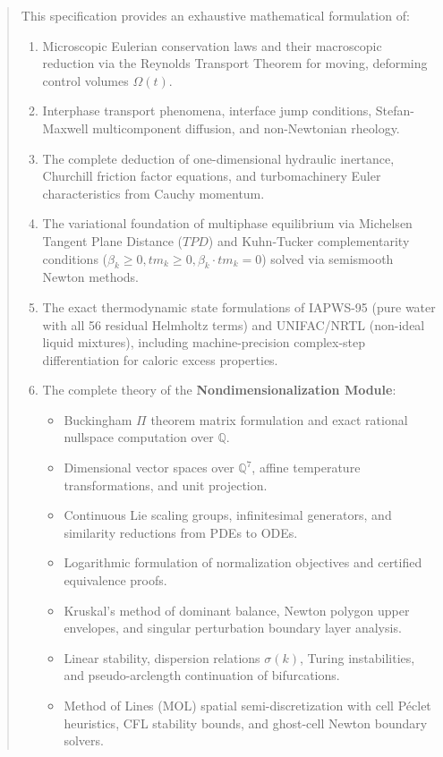 \documentclass[11pt,a4paper]{article}
\begin{document}
\begin{abstract}
This specification provides an exhaustive mathematical formulation of:
\begin{enumerate}[leftmargin=*]
    \item Microscopic Eulerian conservation laws and their macroscopic reduction via the Reynolds Transport Theorem for moving, deforming control volumes $\Omega(t)$.
    \item Interphase transport phenomena, interface jump conditions, Stefan-Maxwell multicomponent diffusion, and non-Newtonian rheology.
    \item The complete deduction of one-dimensional hydraulic inertance, Churchill friction factor equations, and turbomachinery Euler characteristics from Cauchy momentum.
    \item The variational foundation of multiphase equilibrium via Michelsen Tangent Plane Distance ($TPD$) and Kuhn-Tucker complementarity conditions ($\beta_k \ge 0, tm_k \ge 0, \beta_k \cdot tm_k = 0$) solved via semismooth Newton methods.
    \item The exact thermodynamic state formulations of IAPWS-95 (pure water with all 56 residual Helmholtz terms) and UNIFAC/NRTL (non-ideal liquid mixtures), including machine-precision complex-step differentiation for caloric excess properties.
    \item The complete theory of the \textbf{Nondimensionalization Module}:
    \begin{itemize}
        \item Buckingham $\Pi$ theorem matrix formulation and exact rational nullspace computation over $\mathbb{Q}$.
        \item Dimensional vector spaces over $\mathbb{Q}^7$, affine temperature transformations, and unit projection.
        \item Continuous Lie scaling groups, infinitesimal generators, and similarity reductions from PDEs to ODEs.
        \item Logarithmic formulation of normalization objectives and certified equivalence proofs.
        \item Kruskal's method of dominant balance, Newton polygon upper envelopes, and singular perturbation boundary layer analysis.
        \item Linear stability, dispersion relations $\sigma(k)$, Turing instabilities, and pseudo-arclength continuation of bifurcations.
        \item Method of Lines (MOL) spatial semi-discretization with cell P\'eclet heuristics, CFL stability bounds, and ghost-cell Newton boundary solvers.

\end{itemize}
\end{enumerate}
\end{abstract}
\end{document}
